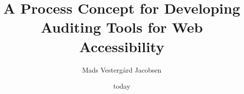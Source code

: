 

\title{
	A Process Concept for Developing Auditing Tools for Web Accessibility
}
\author{Mads Vesterg\aa rd Jacobsen}

\date{today}



\frontmatter
	
	
\mainmatter
	\maketitle

	\pagestyle{headings}
	\setcounter{page}{1}
	

	
	
	
	
	
	
	
	
	
	

	


